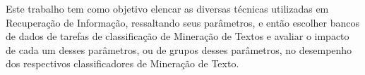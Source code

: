
Este trabalho tem como objetivo elencar as diversas técnicas utilizadas em Recuperação de Informação, ressaltando seus parâmetros, e então escolher bancos de dados de tarefas de classificação de Mineração de Textos e avaliar o impacto de cada um desses parâmetros, ou de grupos desses parâmetros, no desempenho dos respectivos classificadores de Mineração de Texto.
